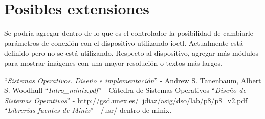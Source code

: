 \documentclass[a4paper,11pt,epsf]{article}
\begin{document}
\section{Posibles extensiones} 
Se podr\'ia agregar dentro de lo que es el controlador la posibilidad de cambiarle par\'ametros de conexi\'on con el dispositivo utilizando ioctl. Actualmente est\'a definido pero no se est\'a utilizando. Respecto al dispositivo, agregar m\'as m\'odulos para mostrar im\'agenes con una mayor resoluci\'on o textos m\'as largos.

\begin{thebibliography}{10}

 ``\textit{Sistemas Operativos. Dise\~no e implementaci\'on}'' - Andrew S. Tanenbaum, Albert S. Woodhull
 ``\textit{Intro\_minix.pdf}'' - C\'atedra de Sistemas Operativos
 ``\textit{Dise\~no de Sistemas Operativos}'' - http://gsd.unex.es/~jdiaz/asig/dso/lab/p8/p8\_v2.pdf
 ``\textit{Librer\'ias fuentes de Minix}'' - /usr/ dentro de minix.
\end{thebibliography}
\end{document}
